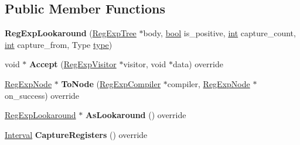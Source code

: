 \subsection*{Public Member Functions}
\begin{DoxyCompactItemize}
\item 
\mbox{\label{classv8_1_1internal_1_1RegExpLookaround_a676a682119f03effcc975fe41c0936c1}} 
{\bfseries Reg\+Exp\+Lookaround} (\mbox{\hyperlink{classv8_1_1internal_1_1RegExpTree}{Reg\+Exp\+Tree}} $\ast$body, \mbox{\hyperlink{classbool}{bool}} is\+\_\+positive, \mbox{\hyperlink{classint}{int}} capture\+\_\+count, \mbox{\hyperlink{classint}{int}} capture\+\_\+from, Type \mbox{\hyperlink{classstd_1_1conditional_1_1type}{type}})
\item 
\mbox{\label{classv8_1_1internal_1_1RegExpLookaround_a42e3aa3233fca1c15774c62d090e7a9f}} 
void $\ast$ {\bfseries Accept} (\mbox{\hyperlink{classv8_1_1internal_1_1RegExpVisitor}{Reg\+Exp\+Visitor}} $\ast$visitor, void $\ast$data) override
\item 
\mbox{\label{classv8_1_1internal_1_1RegExpLookaround_aaecf191fb2547c78b12ad372a0467e73}} 
\mbox{\hyperlink{classv8_1_1internal_1_1RegExpNode}{Reg\+Exp\+Node}} $\ast$ {\bfseries To\+Node} (\mbox{\hyperlink{classv8_1_1internal_1_1RegExpCompiler}{Reg\+Exp\+Compiler}} $\ast$compiler, \mbox{\hyperlink{classv8_1_1internal_1_1RegExpNode}{Reg\+Exp\+Node}} $\ast$on\+\_\+success) override
\item 
\mbox{\label{classv8_1_1internal_1_1RegExpLookaround_a39aca1f129b4c5bb07dc8ef10cc4476c}} 
\mbox{\hyperlink{classv8_1_1internal_1_1RegExpLookaround}{Reg\+Exp\+Lookaround}} $\ast$ {\bfseries As\+Lookaround} () override
\item 
\mbox{\label{classv8_1_1internal_1_1RegExpLookaround_a62644443efa0d13d6c44bdae22be1764}} 
\mbox{\hyperlink{classv8_1_1internal_1_1Interval}{Interval}} {\bfseries Capture\+Registers} () override
\item 
\mbox{\label{classv8_1_1internal_1_1RegExpLookaround_a454f240cf27a5c395306a2ff038e163e}} 

\end{DoxyCompactItemize}
